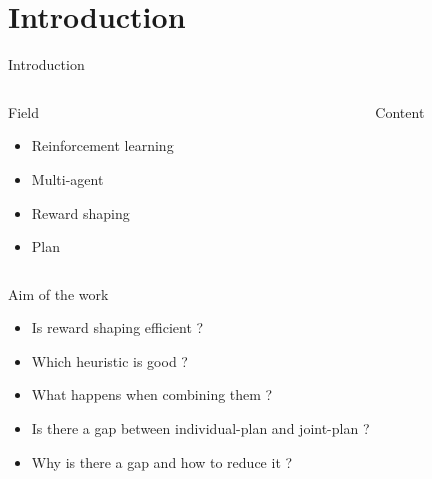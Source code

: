 \documentclass{bredelebeamer}
\begin{document}
\section{Introduction}
\begin{frame}{Introduction}

\begin{columns}[onlytextwidth]
\begin{column}{0.45\linewidth}

\begin{block}{Field}
\begin{itemize}
\item Reinforcement learning
\item Multi-agent
\item Reward shaping
\item Plan
\end{itemize}
\end{block}

\end{column}
\begin{column}{0.015\linewidth}

\end{column}
\begin{column}{0.45\linewidth}
\begin{block}{Content}
$\ $\\
\tableofcontents
$\ $\\

\end{block}

\end{column}
\end{columns}

\begin{exampleblock}{Aim of the work}
\begin{itemize}
\item Is reward shaping efficient ?
\item Which heuristic is good ?
\item What happens when combining them ?
\item Is there a gap between individual-plan and joint-plan ?
\item Why is there a gap and how to reduce it ?
\end{itemize}
\end{exampleblock}

\end{frame}
\end{document}
